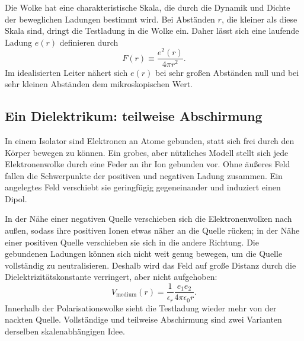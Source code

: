 \begin{classroomqa}
\end{classroomqa}

Die Wolke hat eine charakteristische Skala, die durch die Dynamik und Dichte der beweglichen Ladungen bestimmt wird. Bei Abständen \(r\), die kleiner als diese Skala sind, dringt die Testladung in die Wolke ein. Daher lässt sich eine laufende Ladung \(e(r)\) definieren durch
\begin{equation}
  F(r)\equiv\frac{e^2(r)}{4\pi r^2}.
  \label{eq:l10-running-charge-definition}
\end{equation}
Im idealisierten Leiter nähert sich \(e(r)\) bei sehr großen Abständen null und bei sehr kleinen Abständen dem mikroskopischen Wert.

\subsection{Ein Dielektrikum: teilweise Abschirmung}

In einem Isolator sind Elektronen an Atome gebunden, statt sich frei durch den Körper bewegen zu können. Ein grobes, aber nützliches Modell stellt sich jede Elektronenwolke durch eine Feder an ihr Ion gebunden vor. Ohne äußeres Feld fallen die Schwerpunkte der positiven und negativen Ladung zusammen. Ein angelegtes Feld verschiebt sie geringfügig gegeneinander und induziert einen Dipol.

In der Nähe einer negativen Quelle verschieben sich die Elektronenwolken nach außen, sodass ihre positiven Ionen etwas näher an die Quelle rücken; in der Nähe einer positiven Quelle verschieben sie sich in die andere Richtung. Die gebundenen Ladungen können sich nicht weit genug bewegen, um die Quelle vollständig zu neutralisieren. Deshalb wird das Feld auf große Distanz durch die Dielektrizitätskonstante verringert, aber nicht aufgehoben:
\begin{equation}
  V_{\mathrm{medium}}(r)
  =
  \frac{1}{\epsilon_r}
  \frac{e_1e_2}{4\pi\epsilon_0r}.
  \label{eq:l10-dielectric-coulomb}
\end{equation}
Innerhalb der Polarisationswolke sieht die Testladung wieder mehr von der nackten Quelle. Vollständige und teilweise Abschirmung sind zwei Varianten derselben skalenabhängigen Idee.


